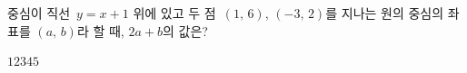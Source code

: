중심이 직선~$y=x+1$ 위에 있고 두 점~$(1,\,6)$, $(-3,\,2)$를 지나는 원의 중심의 좌표를 $(a,\,b)$라 할 때, $2a+b$의 값은?
\begin{choices32}{$1$}{$2$}{$3$}{$4$}{$5$}\end{choices32}
